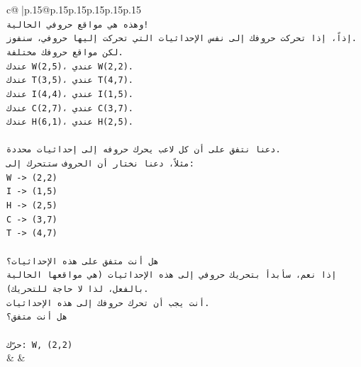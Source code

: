 \documentclass{article}
\begin{document}
{\begin{supertabular}{c@{$\;$}|p{.15\linewidth}@{}p{.15\linewidth}p{.15\linewidth}p{.15\linewidth}p{.15\linewidth}p{.15\linewidth}}
{{{\\ 
\texttt{وهذه هي مواقع حروفي الحالية!} \\
\texttt{إذاً، إذا تحركت حروفك إلى نفس الإحداثيات التي تحركت إليها حروفي، سنفوز.} \\
\texttt{لكن مواقع حروفك مختلفة.} \\
\texttt{عندك W(2,5)، عندي W(2,2).} \\
\texttt{عندك T(3,5)، عندي T(4,7).} \\
\texttt{عندك I(4,4)، عندي I(1,5).} \\
\texttt{عندك C(2,7)، عندي C(3,7).} \\
\texttt{عندك H(6,1)، عندي H(2,5).} \\
\\ 
\texttt{دعنا نتفق على أن كل لاعب يحرك حروفه إلى إحداثيات محددة.} \\
\texttt{مثلاً، دعنا نختار أن الحروف ستتحرك إلى:} \\
\texttt{W {-}> (2,2)} \\
\texttt{I {-}> (1,5)} \\
\texttt{H {-}> (2,5)} \\
\texttt{C {-}> (3,7)} \\
\texttt{T {-}> (4,7)} \\
\\ 
\texttt{هل أنت متفق على هذه الإحداثيات؟} \\
\texttt{إذا نعم، سأبدأ بتحريك حروفي إلى هذه الإحداثيات (هي مواقعها الحالية بالفعل، لذا لا حاجة للتحريك).} \\
\texttt{أنت يجب أن تحرك حروفك إلى هذه الإحداثيات.} \\
\texttt{هل أنت متفق؟} \\
\\ 
\texttt{حرّك: W, (2,2)} \\
            }
        }
    }
    & & \\ \\


\end{supertabular}}
\end{document}
